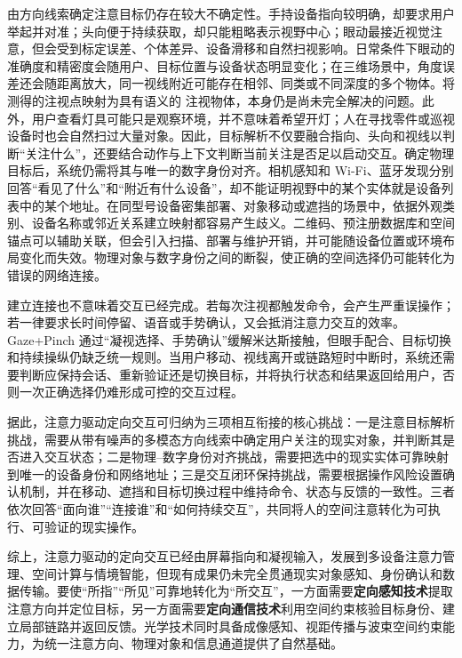 由方向线索确定注意目标仍存在较大不确定性。手持设备指向较明确，却要求用户举起并对准；头向便于持续获取，却只能粗略表示视野中心；眼动最接近视觉注意，但会受到标定误差、个体差异、设备滑移和自然扫视影响。日常条件下眼动的准确度和精密度会随用户、目标位置与设备状态明显变化\supercite{everydaygaze}；在三维场景中，角度误差还会随距离放大，同一视线附近可能存在相邻、同类或不同深度的多个物体。将测得的注视点映射为具有语义的 注视物体，本身仍是尚未完全解决的问题\supercite{gaze_to_object_mapping}。此外，用户查看灯具可能只是观察环境，并不意味着希望开灯；人在寻找零件或巡视设备时也会自然扫过大量对象。因此，目标解析不仅要融合指向、头向和视线以判断“关注什么”，还要结合动作与上下文判断当前关注是否足以启动交互。确定物理目标后，系统仍需将其与唯一的数字身份对齐。相机感知和 Wi-Fi、蓝牙发现分别回答“看见了什么”和“附近有什么设备”，却不能证明视野中的某个实体就是设备列表中的某个地址。在同型号设备密集部署、对象移动或遮挡的场景中，依据外观类别、设备名称或邻近关系建立映射都容易产生歧义。二维码、预注册数据库和空间锚点可以辅助关联，但会引入扫描、部署与维护开销，并可能随设备位置或环境布局变化而失效。物理对象与数字身份之间的断裂，使正确的空间选择仍可能转化为错误的网络连接。

建立连接也不意味着交互已经完成。若每次注视都触发命令，会产生严重误操作；若一律要求长时间停留、语音或手势确认，又会抵消注意力交互的效率。Gaze+Pinch 通过“凝视选择、手势确认”缓解米达斯接触，但眼手配合、目标切换和持续操纵仍缺乏统一规则\supercite{gaze_pinch_challenges}。当用户移动、视线离开或链路短时中断时，系统还需要判断应保持会话、重新验证还是切换目标，并将执行状态和结果返回给用户，否则一次正确选择仍难形成可控的交互过程。

据此，注意力驱动定向交互可归纳为三项相互衔接的核心挑战：一是注意目标解析挑战，需要从带有噪声的多模态方向线索中确定用户关注的现实对象，并判断其是否进入交互状态；二是物理--数字身份对齐挑战，需要把选中的现实实体可靠映射到唯一的设备身份和网络地址；三是交互闭环保持挑战，需要根据操作风险设置确认机制，并在移动、遮挡和目标切换过程中维持命令、状态与反馈的一致性。三者依次回答“面向谁”“连接谁”和“如何持续交互”，共同将人的空间注意转化为可执行、可验证的现实操作。

综上，注意力驱动的定向交互已经由屏幕指向和凝视输入，发展到多设备注意力管理、空间计算与情境智能，但现有成果仍未完全贯通现实对象感知、身份确认和数据传输。要使“所指”“所见”可靠地转化为“所交互”，一方面需要\textbf{定向感知技术}提取注意方向并定位目标，另一方面需要\textbf{定向通信技术}利用空间约束核验目标身份、建立局部链路并返回反馈。光学技术同时具备成像感知、视距传播与波束空间约束能力，为统一注意方向、物理对象和信息通道提供了自然基础。

